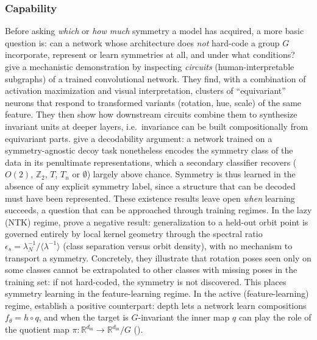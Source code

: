 \documentclass[mathematics,review,submit,moreauthors]{Definitions/mdpi}
\begin{document}
\subsubsection{Capability}\label{sec:disco-capability}
Before asking \emph{which} or \emph{how much} symmetry a model has acquired, a more basic question is: can a network whose architecture does \emph{not} hard-code a group $G$ incorporate, represent or learn symmetries at all, and under what conditions?
\citet{olah2020d} give a mechanistic demonstration by inspecting \emph{circuits} (human-interpretable subgraphs) of a trained convolutional network.
They find, with a combination of activation maximization and visual interpretation, clusters of ``equivariant'' neurons that respond to transformed variants (rotation, hue, scale) of the same feature.
They then show how downstream circuits combine them to synthesize invariant units at deeper layers, i.e.\ invariance can be built compositionally from equivariant parts.
\citet{barenboim2021sp} give a decodability argument: a network trained on a symmetry-agnostic decoy task nonetheless encodes the symmetry class of the data in its penultimate representations, which a secondary classifier recovers ($O(2)$, $\mathbb{Z}_2$, $T$, $T_n$ or $\emptyset$) largely above chance.
Symmetry is thus learned in the absence of any explicit symmetry label, since a structure that can be decoded must have been represented.\newline
These existence results leave open \emph{when} learning succeeds, a question that can be approached through training regimes.
In the lazy (NTK) regime, \citet{perin2025} prove a negative result: generalization to a held-out orbit point is governed entirely by local kernel geometry through the spectral ratio $\epsilon_s = \lambda_N^{-1}/\langle\lambda^{-1}\rangle$ (class separation versus orbit density), with no mechanism to transport a symmetry.
Concretely, they illustrate that rotation poses seen only on some classes cannot be extrapolated to other classes with missing poses in the training set: if not hard-coded, the symmetry is not discovered.
This places symmetry learning in the feature-learning regime.
In the active (feature-learning) regime, \citet{jacot2025} establish a positive counterpart: depth lets a network learn compositions $f_\theta = h \circ q$, and when the target is $G$-invariant the inner map $q$ can play the role of the quotient map $\pi:\mathbb{R}^{d_{\mathrm{in}}} \to \mathbb{R}^{d_{\mathrm{in}}}/G$ ().
\end{document}
